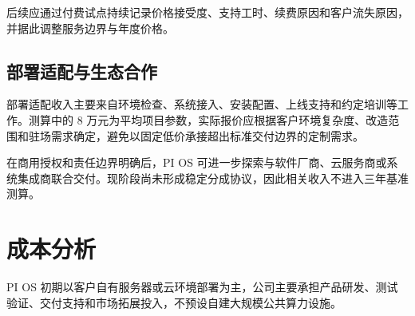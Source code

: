 后续应通过付费试点持续记录价格接受度、支持工时、续费原因和客户流失原因，并据此调整服务边界与年度价格。

\subsection{部署适配与生态合作}\label{sec:6.2.2}
部署适配收入主要来自环境检查、系统接入、安装配置、上线支持和约定培训等工作。测算中的 8 万元为平均项目参数，实际报价应根据客户环境复杂度、改造范围和驻场需求确定，避免以固定低价承接超出标准交付边界的定制需求。

在商用授权和责任边界明确后，PI OS 可进一步探索与软件厂商、云服务商或系统集成商联合交付。现阶段尚未形成稳定分成协议，因此相关收入不进入三年基准测算。

\section{成本分析}\label{sec:6.3}
PI OS 初期以客户自有服务器或云环境部署为主，公司主要承担产品研发、测试验证、交付支持和市场拓展投入，不预设自建大规模公共算力设施。

